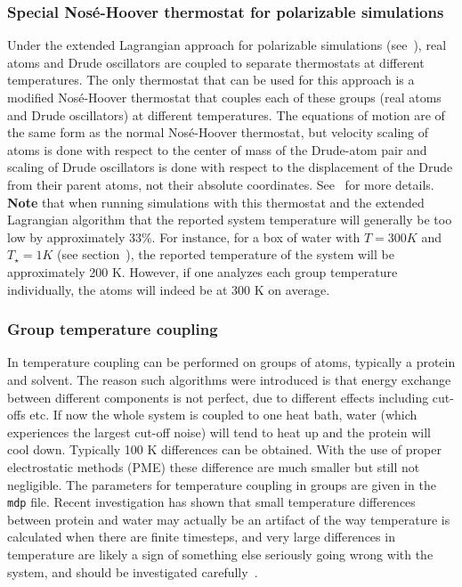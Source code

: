 \subsubsection{Special Nos{\'e}-Hoover thermostat for polarizable simulations}

Under the extended Lagrangian approach for polarizable simulations (see~),
real atoms and Drude oscillators are coupled to separate thermostats at different temperatures.
The only thermostat that can be used for this approach is a modified Nos{\'e}-Hoover
thermostat that couples each of these groups (real atoms and Drude oscillators) at
different temperatures.  The equations of motion are of the same form as the normal
Nos{\'e}-Hoover thermostat, but velocity scaling of atoms is done with respect to the center of
mass of the Drude-atom pair and scaling of Drude oscillators is done with respect to the
displacement of the Drude from their parent atoms, not their absolute coordinates.
See~\cite{Lamoureux2003a} for more details. {\bf Note} that when running simulations
with this thermostat and the extended Lagrangian algorithm that the reported system temperature
will generally be too low by approximately 33\%.  For instance, for a box of water with 
$T = 300 K$ and $T_{\star} = 1 K$ (see section~), the reported temperature
of the system will be approximately 200 K.  However, if one analyzes each group temperature
individually, the atoms will indeed be at 300 K on average.


\subsubsection{Group temperature coupling}%
In {\gromacs} temperature coupling can be performed on groups of
atoms, typically a protein and solvent. The reason such algorithms
were introduced is that energy exchange between different components
is not perfect, due to different effects including cut-offs etc. If
now the whole system is coupled to one heat bath, water (which
experiences the largest cut-off noise) will tend to heat up and the
protein will cool down. Typically 100 K differences can be obtained.
With the use of proper electrostatic methods (PME) these difference
are much smaller but still not negligible.  The parameters for
temperature coupling in groups are given in the {\tt mdp} file.
Recent investigation has shown that small temperature differences
between protein and water may actually be an artifact of the way
temperature is calculated when there are finite timesteps, and very
large differences in temperature are likely a sign of something else
seriously going wrong with the system, and should be investigated
carefully~\cite{Eastwood2010}.

